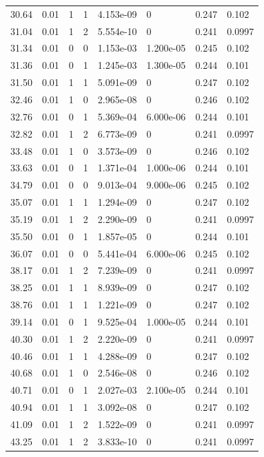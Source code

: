 \documentclass[preview]{standalone}
\begin{document}
{{{\begin{tabular}{L{1.2cm}C{1.2cm} C{0.3cm}C{0.5cm} C{1.4cm}C{1.4cm} C{1.4cm}C{1.4cm}}
  30.64  &  0.01  & 1     &  1 &  4.153e-09  & 0  & 0.247 &  0.102   \\ 
  31.04  &  0.01  & 1     &  2 &  5.554e-10  & 0  & 0.241 &  0.0997   \\ 
  31.34  &  0.01  & 0     &  0 &  1.153e-03  & 1.200e-05  & 0.245 &  0.102   \\ 
  31.36  &  0.01  & 0     &  1 &  1.245e-03  & 1.300e-05  & 0.244 &  0.101   \\ 
  31.50  &  0.01  & 1     &  1 &  5.091e-09  & 0  & 0.247 &  0.102   \\ 
  32.46  &  0.01  & 1     &  0 &  2.965e-08  & 0  & 0.246 &  0.102   \\ 
  32.76  &  0.01  & 0     &  1 &  5.369e-04  & 6.000e-06  & 0.244 &  0.101   \\ 
  32.82  &  0.01  & 1     &  2 &  6.773e-09  & 0  & 0.241 &  0.0997   \\ 
  33.48  &  0.01  & 1     &  0 &  3.573e-09  & 0  & 0.246 &  0.102   \\ 
  33.63  &  0.01  & 0     &  1 &  1.371e-04  & 1.000e-06  & 0.244 &  0.101   \\ 
  34.79  &  0.01  & 0     &  0 &  9.013e-04  & 9.000e-06  & 0.245 &  0.102   \\ 
  35.07  &  0.01  & 1     &  1 &  1.294e-09  & 0  & 0.247 &  0.102   \\ 
  35.19  &  0.01  & 1     &  2 &  2.290e-09  & 0  & 0.241 &  0.0997   \\ 
  35.50  &  0.01  & 0     &  1 &  1.857e-05  & 0  & 0.244 &  0.101   \\ 
  36.07  &  0.01  & 0     &  0 &  5.441e-04  & 6.000e-06  & 0.245 &  0.102   \\ 
  38.17  &  0.01  & 1     &  2 &  7.239e-09  & 0  & 0.241 &  0.0997   \\ 
  38.25  &  0.01  & 1     &  1 &  8.939e-09  & 0  & 0.247 &  0.102   \\ 
  38.76  &  0.01  & 1     &  1 &  1.221e-09  & 0  & 0.247 &  0.102   \\ 
  39.14  &  0.01  & 0     &  1 &  9.525e-04  & 1.000e-05  & 0.244 &  0.101   \\ 
  40.30  &  0.01  & 1     &  2 &  2.220e-09  & 0  & 0.241 &  0.0997   \\ 
  40.46  &  0.01  & 1     &  1 &  4.288e-09  & 0  & 0.247 &  0.102   \\ 
  40.68  &  0.01  & 1     &  0 &  2.546e-08  & 0  & 0.246 &  0.102   \\ 
  40.71  &  0.01  & 0     &  1 &  2.027e-03  & 2.100e-05  & 0.244 &  0.101   \\ 
  40.94  &  0.01  & 1     &  1 &  3.092e-08  & 0  & 0.247 &  0.102   \\ 
  41.09  &  0.01  & 1     &  2 &  1.522e-09  & 0  & 0.241 &  0.0997   \\ 
  43.25  &  0.01  & 1     &  2 &  3.833e-10  & 0  & 0.241 &  0.0997   \\ 
\hline 
\end{tabular} 

}}}
\end{document}
